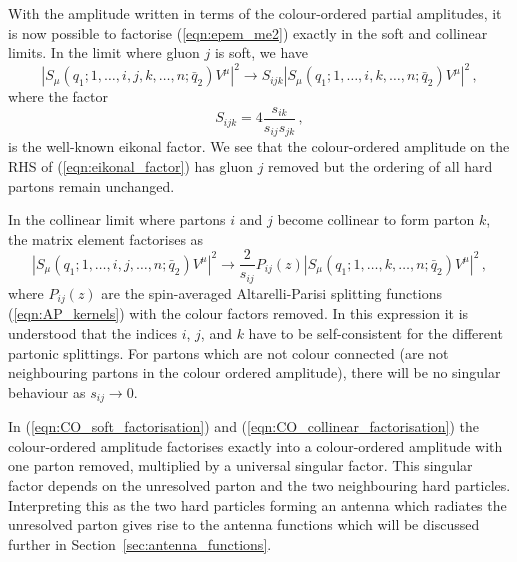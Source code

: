 \documentclass[main.tex]{subfiles}
\begin{document}
    With the amplitude written in terms of the colour-ordered
    partial amplitudes, it is now possible to factorise (\ref{eqn:epem_me2})
    exactly in the soft and collinear limits. In the limit where gluon
    $j$ is soft, we have
    \begin{equation}\label{eqn:CO_soft_factorisation}
        \left|S_{\mu}(q_{1};1,\ldots,i,j,k,\ldots,n;\bar{q}_{2})V^{\mu}\right|^{2} \rightarrow S_{ijk} \left|S_{\mu}(q_{1};1,\ldots,i,k,\ldots,n;\bar{q}_{2})V^{\mu}\right|^{2} \, ,
    \end{equation}
    where the factor
    \begin{equation}\label{eqn:eikonal_factor}
        S_{ijk} = 4\dfrac{s_{ik}}{s_{ij}s_{jk}} \, ,
    \end{equation}
    is the well-known eikonal factor. We see that the colour-ordered
    amplitude on the RHS of (\ref{eqn:eikonal_factor}) has gluon $j$
    removed but the ordering of all hard partons remain unchanged.

    In the collinear limit where partons $i$ and $j$ become collinear
    to form parton $k$, the matrix element factorises as
    \begin{equation}\label{eqn:CO_collinear_factorisation}
        \left|S_{\mu}(q_{1};1,\ldots,i,j,\ldots,n;\bar{q}_{2})V^{\mu}\right|^{2} \rightarrow \dfrac{2}{s_{ij}}P_{ij}(z) \left|S_{\mu}(q_{1};1,\ldots,k,\ldots,n;\bar{q}_{2})V^{\mu}\right|^{2} \, ,
    \end{equation}
    where $P_{ij}(z)$ are the spin-averaged Altarelli-Parisi splitting
    functions (\ref{eqn:AP_kernels}) with the colour factors removed.
    In this expression it is understood that the indices $i$, $j$, and $k$
    have to be self-consistent for the different partonic splittings.
    For partons which are not colour connected (are not neighbouring
    partons in the colour ordered amplitude), there will be no singular
    behaviour as $s_{ij} \rightarrow 0$.

    In (\ref{eqn:CO_soft_factorisation}) and (\ref{eqn:CO_collinear_factorisation})
    the colour-ordered amplitude factorises exactly into a
    colour-ordered amplitude with one parton removed, multiplied
    by a universal singular factor. This singular factor depends on the unresolved
    parton and the two neighbouring hard particles. Interpreting this as
    the two hard particles forming an antenna which radiates the unresolved
    parton gives rise to the antenna functions which will be discussed
    further in Section~\ref{sec:antenna_functions}.
\end{document}
